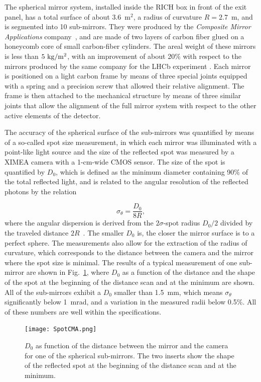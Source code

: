 \documentclass[5p,times,twocolumn]{elsarticle}
\begin{document}
The spherical mirror system, installed inside the RICH box in front of the exit panel, has a total surface of about 3.6~m$^2$,
a radius of curvature $R= 2.7$~m, and is segmented into 10 sub-mirrors. They were produced by the {\it Composite
Mirror Applications} company~\cite{REF:CMA}, and are made of two layers of carbon fiber glued on a honeycomb
core of small carbon-fiber cylinders. The areal weight of these mirrors is less than $\rm 5~kg/m^2$, with an
improvement of about 20\% with respect to the mirrors produced by the same company for the LHCb experiment
\cite{REF:LHCbMirrors}. Each mirror is positioned on a light carbon frame by means of three special joints equipped
with a spring and a precision screw that allowed their relative alignment. The frame is then attached to the mechanical
structure by means of three similar joints that allow the alignment of the full mirror system with respect to the other
active elements of the detector.

The accuracy of the spherical surface of the sub-mirrors was quantified by means of a so-called spot size
measurement, in which each mirror was illuminated with a point-like light source and the size of the reflected spot
was measured by a XIMEA camera with a 1-cm-wide CMOS sensor. The size of the spot is quantified by $D_0$, which
is defined as the minimum diameter containing 90\% of the total reflected light, and is related to the angular resolution
of the reflected photons by the relation

\begin{equation}
  \sigma_{\theta} = \frac{D_0}{8 R},
\end{equation}
%
where the angular dispersion is derived from the $2\sigma$-spot radius $D_0/2$ divided by the traveled distance
$2R$~\cite{REF:LHCbD0}.
The smaller $D_0$ is, the closer the mirror surface is to a perfect sphere. The measurements also allow for the
extraction of the radius of curvature, which corresponds to the distance between the camera and the mirror where
the spot size is minimal. The results of a typical measurement of one sub-mirror are shown in Fig.~\ref{Fig:SpotCMA},
where $D_0$ as a function of the distance and the shape of the spot at the beginning of the distance scan and
at the minimum are shown. All of the sub-mirrors exhibit a $D_0$ smaller than 1.5~mm, which means $\sigma_{\theta}$
significantly below 1~mrad, and a variation in the measured radii below 0.5\%. All of these numbers are well within the
specifications.

\begin{figure}
\begin{center}
\texttt{[image: SpotCMA.png]}
\caption{$D_0$ as function of the distance between the mirror and the camera for one of the spherical sub-mirrors.
  The two inserts show the shape of the reflected spot at the beginning of the distance scan and at the minimum.}
\label{Fig:SpotCMA}
\end{center}
\end{figure}
\end{document}
